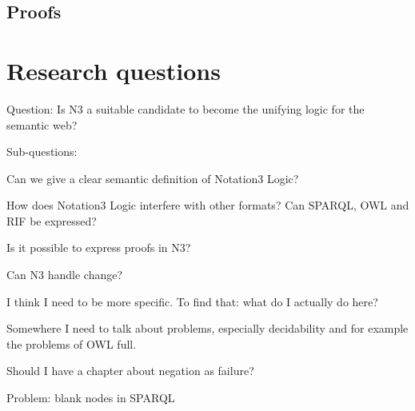 \subsection{Proofs}
\section{Research questions}
Question: Is N3 a suitable candidate to become the unifying logic for the semantic web?

Sub-questions:

Can we give a clear semantic definition of Notation3 Logic?

How does Notation3 Logic interfere with other formats? Can SPARQL, OWL and RIF be expressed?

Is it possible to express proofs in N3?

Can N3 handle change?

I think I need to be more specific. To find that: what do I actually do here?



% 
% 



Somewhere I need to talk about problems, especially decidability and for example the problems of OWL full.

Should I have a chapter about negation as failure?

Problem: blank nodes in SPARQL